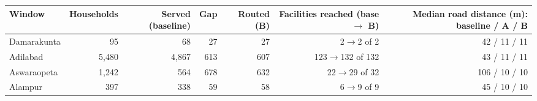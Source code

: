\begin{tabular}{lrrrrrr}
\hline
Window & Households & Served (baseline) & Gap & Routed (B) & Facilities reached (base $\rightarrow$ B) & Median road distance (m): baseline / A / B \\
\hline
Damarakunta & 95 & 68 & 27 & 27 & 2$\rightarrow$2 of 2 & 42 / 11 / 11 \\
Adilabad & 5,480 & 4,867 & 613 & 607 & 123$\rightarrow$132 of 132 & 43 / 11 / 11 \\
Aswaraopeta & 1,242 & 564 & 678 & 632 & 22$\rightarrow$29 of 32 & 106 / 10 / 10 \\
Alampur & 397 & 338 & 59 & 58 & 6$\rightarrow$9 of 9 & 45 / 10 / 10 \\
\hline
\end{tabular}
